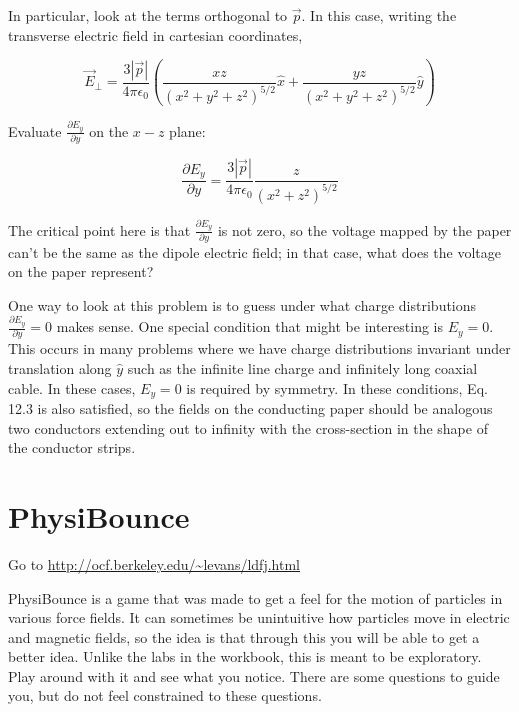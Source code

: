 \documentclass[12pt]{book}
\begin{document}
In particular, look at the terms orthogonal to $\vec{p}$. In this case, writing the transverse electric field in cartesian coordinates,

\begin{equation*}
 \vec{E}_\perp = \frac{3|\vec{p}|}{4\pi\epsilon_0}\left(\frac{xz}{(x^2+y^2+z^2)^{5/2}}\hat{x}+\frac{yz}{(x^2+y^2+z^2)^{5/2}}\hat{y}\right)
\end{equation*}

Evaluate $\frac{\partial E_y}{\partial y}$ on the $x-z$ plane:

\begin{equation*}
 \frac{\partial E_y}{\partial y} = \frac{3|\vec{p}|}{4\pi\epsilon_0}\frac{z}{(x^2+z^2)^{5/2}}
\end{equation*}

The critical point here is that $\frac{\partial E_y}{\partial y} $ is not zero, so the voltage mapped by the paper can’t be the same as the dipole electric field; in that case, what does the voltage on the paper represent?

One way to look at this problem is to guess under what charge distributions $\frac{\partial E_y}{\partial y} =0$ makes sense. One special condition that might be interesting is $E_y = 0.$ This occurs in many problems where we have charge distributions invariant under translation along $\hat{y}$ such as the infinite line charge and infinitely long coaxial cable. In these cases, $E_y = 0$ is required by symmetry. In these conditions, Eq. 12.3 is also satisfied, so the fields on the conducting paper should be analogous two conductors extending out to infinity with the
cross-section in the shape of the conductor strips.




\pagebreak

\section{PhysiBounce}

Go to \url{http://ocf.berkeley.edu/~levans/ldfj.html}

PhysiBounce is a game that was made to get a feel for the motion of particles in various force fields. It can sometimes be unintuitive how particles move in electric and magnetic fields, so the idea is that through this you will be able to get a better idea. Unlike the labs in the workbook, this is meant to be exploratory. Play around with it and see what you notice. There are some questions to guide you, but do not feel constrained to these questions.
\end{document}

